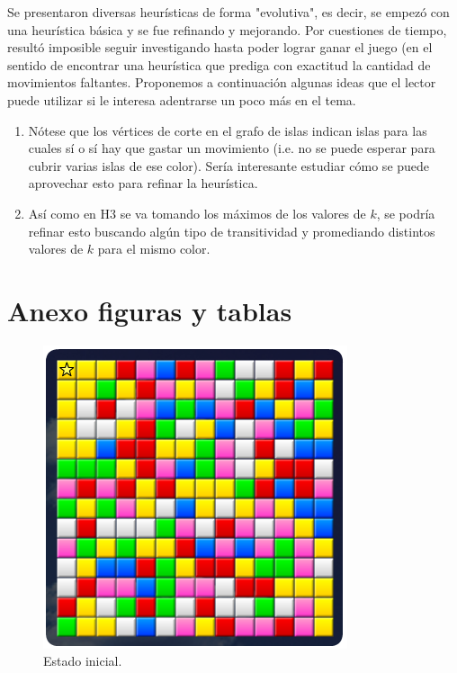 \documentclass{article}
\begin{document}
Se presentaron diversas heur\'isticas de forma "evolutiva", es decir, 
se empez\'o con una heur\'istica b\'asica y se fue refinando y 
mejorando. Por cuestiones de tiempo, result\'o imposible seguir 
investigando hasta poder lograr ganar el juego (en el sentido de 
encontrar una heur\'istica que prediga con exactitud la cantidad 
de movimientos faltantes. Proponemos a continuaci\'on algunas ideas que el 
lector puede utilizar si le interesa adentrarse un poco m\'as en el tema.
\begin{enumerate}
	\item N\'otese que los v\'ertices de corte en el grafo de islas indican islas para las cuales s\'i o s\'i hay que gastar un movimiento (i.e. no se puede esperar para cubrir varias islas de ese color). Ser\'ia interesante estudiar c\'omo se puede aprovechar esto para refinar la heur\'istica.
    \item As\'i como en H3 se va tomando los m\'aximos de los valores de $k$, se podr\'ia refinar esto buscando alg\'un tipo de transitividad y promediando distintos valores de $k$ para el mismo color.
\end{enumerate}

\newpage
\section{Anexo figuras y tablas}

\begin{figure}[h!]
  \caption{Estado inicial.}
  \label{inicial}
  \centering
    \includegraphics[scale=0.88]{initialState.png}
\end{figure}
\end{document}
